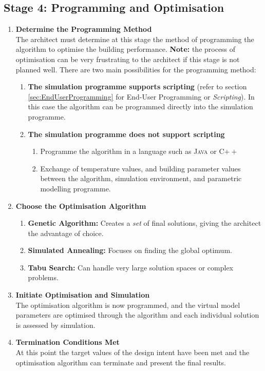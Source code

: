 \clearpage
\subsection{Stage 4: Programming and Optimisation}
\label{sec:Stage4}
\vspace{0.5cm}
\begin{enumerate}
	\item \textbf{Determine the Programming Method}\\[3mm]
		The architect must determine at this stage the method of programming the algorithm to optimise the building performance. \textbf{Note:} the process of optimisation can be very frustrating to the architect if this stage is not planned well. There are two main possibilities for the programming method:
		\begin{enumerate}
			\item \textbf{The simulation programme supports scripting} (refer to section \ref{sec:EndUserProgramming} for End-User Programming or \emph{Scripting}). In this case the algorithm can be programmed directly into the simulation programme.
			\item \textbf{The simulation programme does not support scripting}
				\begin{enumerate}
					\item Programme the algorithm in a language such as \textsc{Java} or C$++$ 
					\item Exchange of temperature values, and building parameter values between the algorithm, simulation environment, and parametric modelling programme.
				\end{enumerate}
		\end{enumerate}
	\item \textbf{Choose the Optimisation Algorithm}
		\begin{enumerate}
			\item \textbf{Genetic Algorithm:} Creates a \emph{set} of final solutions, giving the architect the advantage of choice.
			\item \textbf{Simulated Annealing:} Focuses on finding the global optimum.
			\item \textbf{Tabu Search:} Can handle very large solution spaces or complex problems.
		\end{enumerate}
	\item \textbf{Initiate Optimisation and Simulation}\\[3mm]
		The optimisation algorithm is now programmed, and the virtual model parameters are optimised through the algorithm and each individual solution is assessed by simulation.
	\item \textbf{Termination Conditions Met}\\[3mm]
		At this point the target values of the design intent have been met and the optimisation algorithm can terminate and present the final results.
\end{enumerate}

